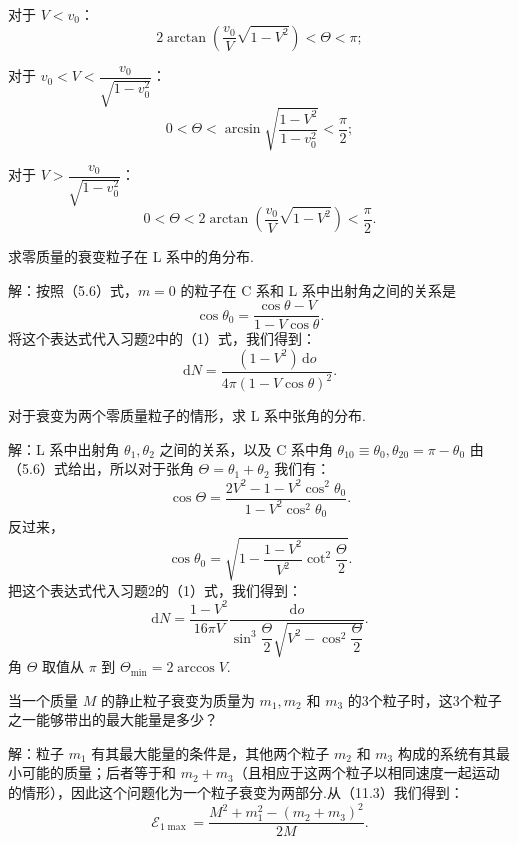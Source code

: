 \begin{xiti}
对于 $V<v_0$：
\begin{equation*}
  2\arctan\left(\frac{v_0}{V}\sqrt{1-V^2}\right)<\Theta<\pi;
\end{equation*}

对于 $v_0<V<\dfrac{v_0}{\sqrt{1-v_0^2}}$：
\begin{equation*}
  0<\Theta<\arcsin\sqrt{\frac{1-V^2}{1-v_0^2}}<\frac{\pi}{2};
\end{equation*}

对于 $V>\dfrac{v_0}{\sqrt{1-v_0^2}}$：
\begin{equation*}
  0<\Theta<2\arctan\left(\frac{v_0}{V}\sqrt{1-V^2}\right)<\frac{\pi}{2}.
\end{equation*}

\quad 求零质量的衰变粒子在 L 系中的角分布.

解：按照（5.6）式，$m=0$ 的粒子在 C 系和 L 系中出射角之间的关系是
\begin{equation*}
  \cos\theta_0=\frac{\cos\theta-V}{1-V\cos\theta}.
\end{equation*}
将这个表达式代入习题2中的（1）式，我们得到：
\begin{equation*}
  \mathrm{d}N=\frac{(1-V^2)\,\mathrm{d}o}{4\pi(1-V\cos\theta)^2}.
\end{equation*}

\quad 对于衰变为两个零质量粒子的情形，求 L 系中张角的分布.

解：L 系中出射角 $\theta_1,\theta_2$ 之间的关系，以及 C 系中角 $\theta_{10}\equiv\theta_0,\theta_{20}=\pi-\theta_0$ 由（5.6）式给出，所以对于张角 $\Theta=\theta_1+\theta_2$ 我们有：
\begin{equation*}
  \cos\Theta=\frac{2V^2-1-V^2\cos^2\theta_0}{1-V^2\cos^2\theta_0}.
\end{equation*}
反过来，
\begin{equation*}
  \cos\theta_0=\sqrt{1-\frac{1-V^2}{V^2}\cot^2\frac{\Theta}{2}}.
\end{equation*}
把这个表达式代入习题2的（1）式，我们得到：
\begin{equation*}
  \mathrm{d}N=\frac{1-V^2}{16\pi V}
  \frac{\mathrm{d}o}{\sin^3\dfrac{\Theta}{2}
  \sqrt{V^2-\cos^2\dfrac{\Theta}{2}}}.
\end{equation*}
角 $\Theta$ 取值从 $\pi$ 到 $\Theta_{\min}=2\arccos V$.

\quad 当一个质量 $M$ 的静止粒子衰变为质量为 $m_1,m_2$ 和 $m_3$ 的3个粒子时，这3个粒子之一能够带出的最大能量是多少？

解：粒子 $m_1$ 有其最大能量的条件是，其他两个粒子 $m_2$ 和 $m_3$ 构成的系统有其最小可能的质量；后者等于和 $m_2+m_3$（且相应于这两个粒子以相同速度一起运动的情形），因此这个问题化为一个粒子衰变为两部分.从（11.3）我们得到：
\begin{equation*}
  \mathcal{E}_{1\max}=\frac{M^2+m_1^2-(m_2+m_3)^2}{2M}.
\end{equation*}

\end{xiti}

